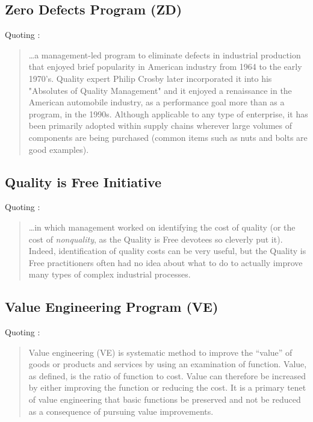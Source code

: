 \documentclass[12pt,a4paper]{report}
\begin{document}
\subsection{Zero Defects Program (ZD)}
Quoting \cite{wikipedia_zero_2015}:
\begin{quote}
\dots a management-led program to eliminate defects in industrial production that enjoyed brief popularity in American industry from 1964 to the early 1970's. Quality expert Philip Crosby later incorporated it into his "Absolutes of Quality Management" and it enjoyed a renaissance in the American automobile industry, as a performance goal more than as a program, in the 1990s. Although applicable to any type of enterprise, it has been primarily adopted within supply chains wherever large volumes of components are being purchased (common items such as nuts and bolts are good examples).
\end{quote}


\subsection{Quality is Free Initiative}
Quoting \cite{montgomery_introduction_2007}:
\begin{quote}
\dots in which management worked on identifying the cost of quality (or the cost of \emph{nonquality}, as the Quality is Free devotees so cleverly put it). Indeed, identification of quality costs can be very useful, but the Quality is Free practitioners often had no idea about what to do to actually improve many types of complex industrial processes.
\end{quote}


\subsection{Value Engineering Program (VE)}
Quoting \cite{wikipedia_value_2015}:
\begin{quote}
Value engineering (VE) is systematic method to improve the ``value'' of goods or products and services by using an examination of function. Value, as defined, is the ratio of function to cost. Value can therefore be increased by either improving the function or reducing the cost. It is a primary tenet of value engineering that basic functions be preserved and not be reduced as a consequence of pursuing value improvements.

\end{quote}
\end{document}
